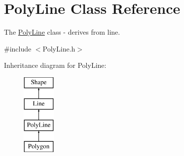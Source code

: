 \hypertarget{class_poly_line}{}\section{Poly\+Line Class Reference}
\label{class_poly_line}


The \hyperlink{class_poly_line}{Poly\+Line} class -\/ derives from line.  




{\ttfamily \#include $<$Poly\+Line.\+h$>$}

Inheritance diagram for Poly\+Line\+:\begin{figure}[H]
\begin{center}
\leavevmode
\includegraphics[height=4.000000cm]{class_poly_line}
\end{center}
\end{figure}
